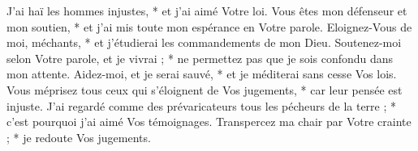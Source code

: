 J'ai haï les hommes injustes, * et j'ai aimé Votre loi.
\versseparator
Vous êtes mon défenseur et mon soutien, * et j'ai mis toute mon espérance en Votre parole.
\versseparator
Eloignez-Vous de moi, méchants, * et j'étudierai les commandements de mon Dieu.
\versseparator
Soutenez-moi selon Votre parole, et je vivrai ; * ne permettez pas que je sois confondu dans mon attente.
\versseparator
Aidez-moi, et je serai sauvé, * et je méditerai sans cesse Vos lois.
\versseparator
Vous méprisez tous ceux qui s'éloignent de Vos jugements, * car leur pensée est injuste.
\versseparator
J'ai regardé comme des prévaricateurs tous les pécheurs de la terre ; * c'est pourquoi j'ai aimé Vos témoignages.
\versseparator
Transpercez ma chair par Votre crainte ; * je redoute Vos jugements.